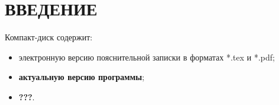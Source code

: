 






\newpage
{}
\tableofcontents

\newpage
{}


\titleformat{\section}{\centering\normalfont\normalsize}{\thesection}{1.0em}{}
\titleformat{\subsection}{\centering\normalfont\normalsize}{\thesubsection}{1.0em}{}
\titleformat{\subsubsection}{\centering\normalfont\normalsize}{\thesubsection}{1.0em}{}

\newpage
{}
\setcounter{section}{0}
\section*{ВВЕДЕНИЕ}







\clearpage
\renewcommand{\refname}{Список использованных источников}


Компакт-диск содержит: 
\begin{itemize}
\item электронную версию пояснительной записки в форматах *.tex и *.pdf;
\item \textbf{актуальную версию программы};
\item \textbf{???}.
\end{itemize}


